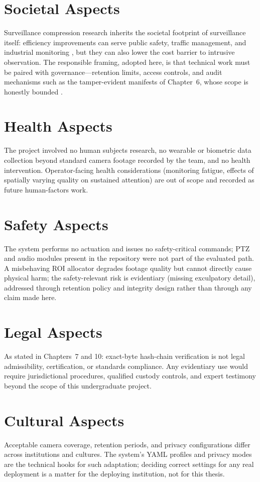 \section{Societal Aspects}

Surveillance compression research inherits the societal footprint of surveillance itself: efficiency improvements can serve public safety, traffic management, and industrial monitoring \cite{Shao2018Smart,Chen2019DIVS}, but they can also lower the cost barrier to intrusive observation. The responsible framing, adopted here, is that technical work must be paired with governance---retention limits, access controls, and audit mechanisms such as the tamper-evident manifests of Chapter~6, whose scope is honestly bounded \cite{Kanwal2020Chain}.

\section{Health Aspects}

The project involved no human subjects research, no wearable or biometric data collection beyond standard camera footage recorded by the team, and no health intervention. Operator-facing health considerations (monitoring fatigue, effects of spatially varying quality on sustained attention) are out of scope and recorded as future human-factors work.

\section{Safety Aspects}

The system performs no actuation and issues no safety-critical commands; PTZ and audio modules present in the repository were not part of the evaluated path. A misbehaving ROI allocator degrades footage quality but cannot directly cause physical harm; the safety-relevant risk is evidentiary (missing exculpatory detail), addressed through retention policy and integrity design rather than through any claim made here.

\section{Legal Aspects}

As stated in Chapters~7 and 10: exact-byte hash-chain verification is not legal admissibility, certification, or standards compliance. Any evidentiary use would require jurisdictional procedures, qualified custody controls, and expert testimony beyond the scope of this undergraduate project.

\section{Cultural Aspects}

Acceptable camera coverage, retention periods, and privacy configurations differ across institutions and cultures. The system's YAML profiles and privacy modes are the technical hooks for such adaptation; deciding correct settings for any real deployment is a matter for the deploying institution, not for this thesis.
